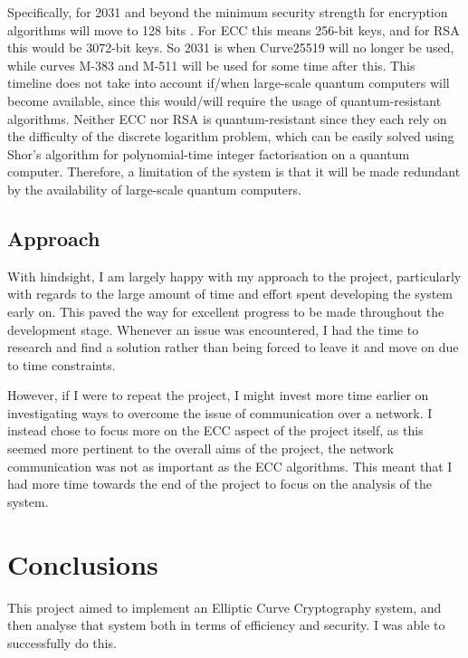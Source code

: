 \documentclass[12pt,a4paper]{article}
\begin{document}
Specifically, for 2031 and beyond the minimum security strength for encryption algorithms will move to 128 bits \cite[p59]{barker2020recommendation}. 
For ECC this means 256-bit keys, and for RSA this would be 3072-bit keys. 
So 2031 is when Curve25519 will no longer be used, while curves M-383 and M-511 will be used for some time after this. 
This timeline does not take into account if/when large-scale quantum computers will become available, 
since this would/will require the usage of quantum-resistant algorithms. 
Neither ECC nor RSA is quantum-resistant since they each rely on the difficulty of the discrete logarithm problem, 
which can be easily solved using Shor's algorithm for polynomial-time integer factorisation on a quantum computer. 
Therefore, a limitation of the system is that it will be made redundant by the availability of large-scale quantum computers. 


\subsection{Approach} \noindent \label{Approach}
With hindsight, I am largely happy with my approach to the project, particularly with regards to the large amount of time and effort spent developing the system early on. 
This paved the way for excellent progress to be made throughout the development stage. 
Whenever an issue was encountered, I had the time to research and find a solution rather than being forced to leave it and move on due to time constraints. 

However, if I were to repeat the project, I might invest more time earlier on investigating ways to overcome the issue of communication over a network. 
I instead chose to focus more on the ECC aspect of the project itself, as this seemed more pertinent to the overall aims of the project, the network communication was not as important as the ECC algorithms. 
This meant that I had more time towards the end of the project to focus on the analysis of the system. 



\section{Conclusions} \noindent
This project aimed to implement an Elliptic Curve Cryptography system, 
and then analyse that system both in terms of efficiency and security. 
I was able to successfully do this. 
\end{document}
